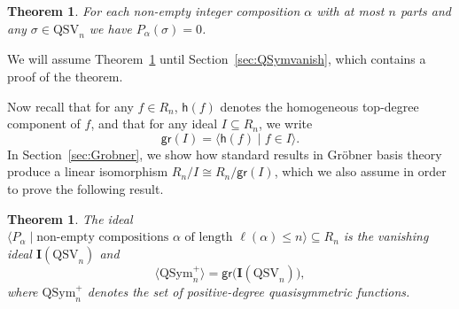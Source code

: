 \documentclass[12pt]{amsart}
\newtheorem{thm}[equation]{Theorem}
\theoremstyle{definition}
\theoremstyle{remark}
\numberwithin{equation}{section}
\newcommand{\QSym}{\mathrm{QSym}}
\newcommand{\QSV}{\mathrm{QSV}}
\begin{document}
\begin{thm}
\label{thm:vanishing}
For each non-empty integer composition $\alpha$ with at most $n$ parts and any $\sigma\in \QSV_n$ we have $P_{\alpha} (\sigma)=0$.
\end{thm}

We will assume Theorem~\ref{thm:vanishing} until Section~\ref{sec:QSymvanish}, which contains a proof of the theorem.

Now recall that for any $f \in R_{n}$, $\mathsf{h}(f)$ denotes the homogeneous top-degree component of $f$, and that for any ideal $I \subseteq R_{n}$, we write
\[
\mathsf{gr}(I) = \langle \mathsf{h}(f) \;|\; f \in I \rangle.
\]
In Section~\ref{sec:Grobner}, we show how standard results in Gr\"{o}bner basis theory produce a linear isomorphism $R_{n}\big/I \cong R_{n} \big/ \mathsf{gr}(I)$, which we also assume in order to prove the following result.

\begin{thm}\label{thm:vanishingQSV} 
The ideal $\langle P_{\alpha} \;|\; \text{non-empty compositions $\alpha$ of length $\ell(\alpha) \le n$} \rangle \subseteq R_n$ is the vanishing ideal $\mathbf{I}(\QSV_n)$ and 
\[
\langle \QSym_{n}^{+} \rangle = \mathsf{gr}\big(\mathbf{I}(\QSV_{n})\big),
\]
where  $\QSym_{n}^{+}$ denotes the set of positive-degree quasisymmetric functions.
 \end{thm}
 
\end{document}
